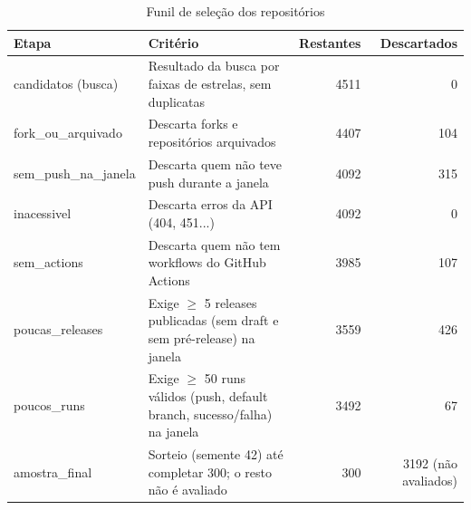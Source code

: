 \begin{table}[htbp]
\centering
\caption{Funil de seleção dos repositórios}
\label{tab:funil}
\begin{tabular}{llrr}
\hline
Etapa & Critério & Restantes & Descartados \\
\hline
candidatos (busca) & Resultado da busca por faixas de estrelas, sem duplicatas & 4511 & 0 \\
fork\_ou\_arquivado & Descarta forks e repositórios arquivados & 4407 & 104 \\
sem\_push\_na\_janela & Descarta quem não teve push durante a janela & 4092 & 315 \\
inacessivel & Descarta erros da API (404, 451...) & 4092 & 0 \\
sem\_actions & Descarta quem não tem workflows do GitHub Actions & 3985 & 107 \\
poucas\_releases & Exige $\geq$ 5 releases publicadas (sem draft e sem pré-release) na janela & 3559 & 426 \\
poucos\_runs & Exige $\geq$ 50 runs válidos (push, default branch, sucesso/falha) na janela & 3492 & 67 \\
amostra\_final & Sorteio (semente 42) até completar 300; o resto não é avaliado & 300 & 3192 (não avaliados) \\
\hline
\end{tabular}
\end{table}
